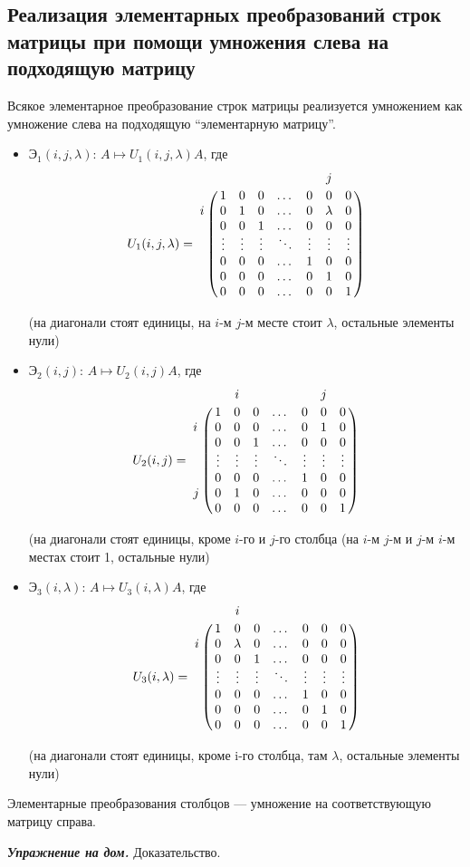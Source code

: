 \subsection{Реализация элементарных преобразований строк матрицы при помощи умножения слева на подходящую матрицу}

Всякое элементарное преобразование строк матрицы реализуется умножением как умножение слева на подходящую ``элементарную матрицу''.

\begin{itemize}
\item 
    $\text{Э}_1(i, j, \lambda)$: $A \mapsto U_1(i, j, \lambda)A$, где
    \begin{equation*}
        U_1(i, j, \lambda) = \bordermatrix{
            &   &   &   &   &   & j &   \cr
            & 1 & 0 & 0 & \dots & 0 & 0 & 0 \cr
          i & 0 & 1 & 0 & \dots & 0 & \lambda & 0 \cr
            & 0 & 0 & 1 & \dots & 0 & 0 & 0 \cr
            & \vdots & \vdots & \vdots & \ddots & \vdots & \vdots & \vdots \cr
            & 0 & 0 & 0 & \dots & 1 & 0 & 0 \cr
            & 0 & 0 & 0 & \dots & 0 & 1 & 0 \cr
            & 0 & 0 & 0 & \dots & 0 & 0 & 1
        }
    \end{equation*}

    (на диагонали стоят единицы, на $i$-м $j$-м месте стоит $\lambda$, остальные элементы нули)

\item

    $\text{Э}_2(i, j)$: $A \mapsto U_2(i, j)A$, где
    \begin{equation*}
        U_2(i, j) = \bordermatrix{
            &   & i &   &   &   & j &   \cr
            & 1 & 0 & 0 & \dots & 0 & 0 & 0 \cr
          i & 0 & 0 & 0 & \dots & 0 & 1 & 0 \cr
            & 0 & 0 & 1 & \dots & 0 & 0 & 0 \cr
            & \vdots & \vdots & \vdots & \ddots & \vdots & \vdots & \vdots \cr
            & 0 & 0 & 0 & \dots & 1 & 0 & 0 \cr
          j & 0 & 1 & 0 & \dots & 0 & 0 & 0 \cr
            & 0 & 0 & 0 & \dots & 0 & 0 & 1
        }
    \end{equation*}

    (на диагонали стоят единицы, кроме $i$-го и $j$-го столбца (на $i$-м $j$-м и $j$-м $i$-м местах стоит 1, остальные нули)

\item 
    $\text{Э}_3(i, \lambda)$: $A \mapsto U_3(i, \lambda)A$, где
    \begin{equation*}
        U_3(i, \lambda) = \bordermatrix{    
            &   & i &   &   &   &   &   \cr
            & 1 & 0 & 0 & \dots & 0 & 0 & 0 \cr
          i & 0 & \lambda & 0 & \dots & 0 & 0 & 0 \cr
            & 0 & 0 & 1 & \dots & 0 & 0 & 0 \cr
            & \vdots & \vdots & \vdots & \ddots & \vdots & \vdots & \vdots \cr
            & 0 & 0 & 0 & \dots & 1 & 0 & 0 \cr
            & 0 & 0 & 0 & \dots & 0 & 1 & 0 \cr
            & 0 & 0 & 0 & \dots & 0 & 0 & 1
        }
    \end{equation*}

    (на диагонали стоят единицы, кроме i-го столбца, там $\lambda$, остальные элементы нули)
\end{itemize}

Элементарные преобразования столбцов --- умножение на соответствующую матрицу справа.

\bigskip
\textit{\textbf{Упражнение на дом.}} Доказательство.
